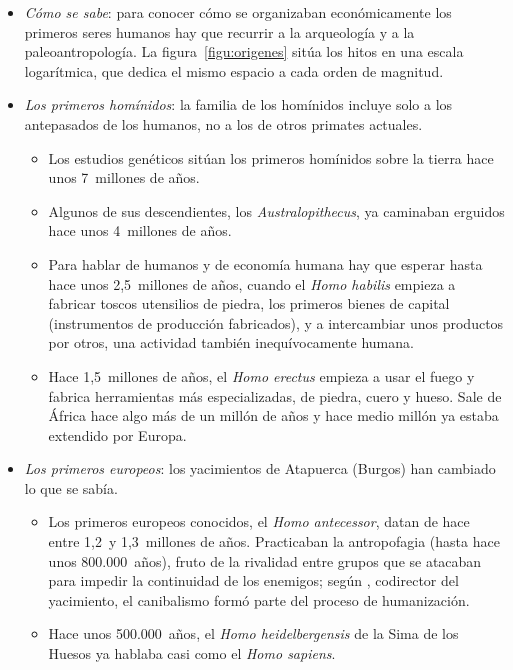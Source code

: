 \documentclass[11pt]{article}
\begin{document}
\begin{itemize}
\item \emph{Cómo se sabe}: para conocer cómo se organizaban económicamente los primeros seres humanos hay que recurrir a la arqueología y a la paleoantropología. La figura~\ref{figu:origenes} sitúa los hitos en una escala logarítmica, que dedica el mismo espacio a cada orden de magnitud.
\item \emph{Los primeros homínidos}: la familia de los homínidos incluye solo a los antepasados de los humanos, no a los de otros primates actuales.
  \begin{itemize}
  \item Los estudios genéticos sitúan los primeros homínidos sobre la tierra hace unos 7~millones de años\nocite{Comin2014Historia}.
  \item Algunos de sus descendientes, los \emph{Australopithecus}, ya caminaban erguidos hace unos 4~millones de años\nocite{Comin2014Historia}.
  \item Para hablar de humanos y de economía humana hay que esperar hasta hace unos 2,5~millones de años, cuando el \emph{Homo habilis} empieza a fabricar toscos utensilios de piedra, los primeros bienes de capital (instrumentos de producción fabricados), y a intercambiar unos productos por otros, una actividad también inequívocamente humana\nocite{Comin2014Historia}.
  \item Hace 1,5~millones de años, el \emph{Homo erectus} empieza a usar el fuego y fabrica herramientas más especializadas, de piedra, cuero y hueso. Sale de África hace algo más de un millón de años y hace medio millón ya estaba extendido por Europa\nocite{Comin2014Historia}.
  \end{itemize}
\item \emph{Los primeros europeos}: los yacimientos de Atapuerca (Burgos) han cambiado lo que se sabía.
  \begin{itemize}
  \item Los primeros europeos conocidos, el \emph{Homo antecessor}, datan de hace entre 1,2~y 1,3~millones de años. Practicaban la antropofagia (hasta hace unos 800.000~años), fruto de la rivalidad entre grupos que se atacaban para impedir la continuidad de los enemigos; según , codirector del yacimiento, el canibalismo formó parte del proceso de humanización\nocite{Comin2014Historia}.
  \item Hace unos 500.000~años, el \emph{Homo heidelbergensis} de la Sima de los Huesos ya hablaba casi como el \emph{Homo sapiens}.

\end{itemize}
\end{itemize}
\end{document}
